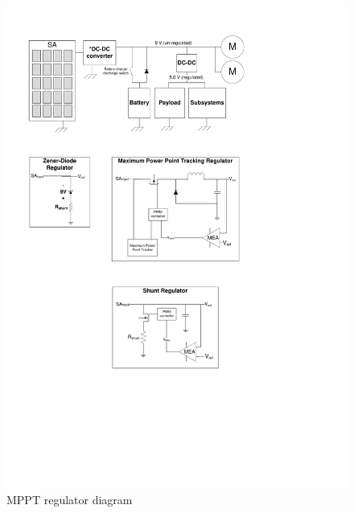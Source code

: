 \begin{figure}[H]
\centering
\includegraphics[scale=1]{figures/fig_PDR_MPPTdiagram}
\caption{\ac{MPPT} regulator diagram}
\label{fig:MPPT_regulator}
\end{figure}
%
%
